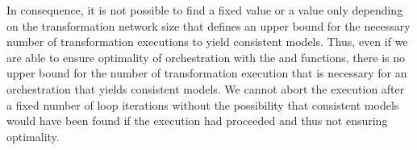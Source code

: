 In consequence, it is not possible to find a fixed value or a value only depending on the transformation network size that defines an upper bound for the necessary number of transformation executions to yield consistent models.
Thus, even if we are able to ensure optimality of orchestration with the  and  functions, there is no upper bound for the number of transformation execution that is necessary for an orchestration that yields consistent models.
We cannot abort the execution after a fixed number of loop iterations without the possibility that consistent models would have been found if the execution had proceeded and thus not ensuring optimality.





